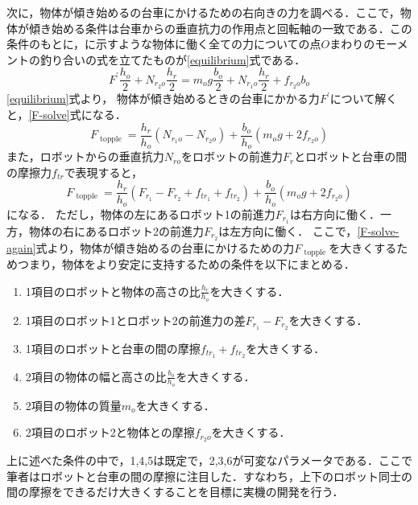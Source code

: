 次に，物体が傾き始めるの台車にかけるための右向きの力を調べる．ここで，物体が傾き始める条件は台車からの垂直抗力の作用点と回転軸の一致である．この条件のもとに，に示すような物体に働く全ての力についての点$O$まわりのモーメントの釣り合いの式を立てたものが\eqref{equilibrium}式である．
\begin{equation}
F^{\prime} \frac{h_{o}}{2}+N_{r_{2} o} \frac{h_{r}}{2}=m_{o} g \frac{b_{o}}{2}+N_{r_{1} o} \frac{h_{r}}{2}+f_{r_{2} o} b_{o}
\label{equilibrium}
\end{equation}
\eqref{equilibrium}式より，
物体が傾き始めるときの台車にかかる力$F^{\prime}$について解くと，\eqref{F-solve}式になる．
\begin{equation}
    F_{\text { topple }}=\frac{h_{r}}{h_{o}}\left(N_{r_{1} o}-N_{r_{2} o}\right)+\frac{b_{o}}{h_{o}}\left(m_{o} g+2 f_{r_2 o}\right)
    \label{F-solve}
\end{equation}
また，ロボットからの垂直抗力$N_{ro}$をロボットの前進力$F_{r}$とロボットと台車の間の摩擦力$f_{tr}$で表現すると，
\begin{equation}
    F_{\text { topple }}=\frac{h_{r}}{h_{o}}\left(F_{r_{1}}-F_{r_{2}}+f_{t{r_1}}+f_{t{r_2}}\right)+\frac{b_{o}}{h_{o}}\left(m_{o} g+2 f_{r_2 o}\right)
    \label{F-solve-again}
\end{equation}
になる．
ただし，物体の左にあるロボット1の前進力$F_{r_{1}}$は右方向に働く．一方，物体の右にあるロボット2の前進力$F_{r_{2}}$は左方向に働く．
ここで，\eqref{F-solve-again}式より，物体が傾き始めるの台車にかけるための力$F_{\text { topple }}$を大きくするためつまり，物体をより安定に支持するための条件を以下にまとめる．
\begin{enumerate}
    \item 1項目のロボットと物体の高さの比$\frac{h_{r}}{h_{o}}$を大きくする．
    \item 1項目のロボット1とロボット2の前進力の差$F_{r_{1}}-F_{r_{2}}$を大きくする．
    \item 1項目のロボットと台車の間の摩擦$f_{t{r_1}}+f_{t{r_2}}$を大きくする．
    \item 2項目の物体の幅と高さの比$\frac{b_{o}}{h_{o}}$を大きくする．
    \item 2項目の物体の質量$m_{o}$を大きくする．
    \item 2項目のロボット2と物体との摩擦$f_{r_2 o}$を大きくする．  
\end{enumerate}
上に述べた条件の中で，1,4,5は既定で，2,3,6が可変なパラメータである．ここで筆者はロボットと台車の間の摩擦に注目した．すなわち，上下のロボット同士の間の摩擦をできるだけ大きくすることを目標に実機の開発を行う．


